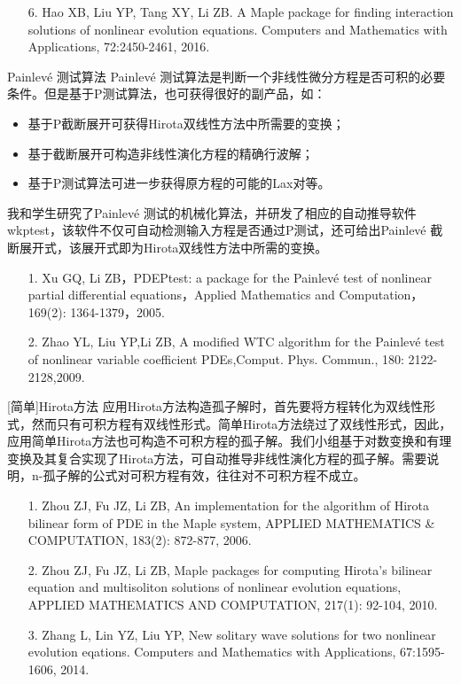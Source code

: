 \documentclass{beamer}
\begin{document}
\begin{frame}
  \begin{itemize}
    \item[6.] Hao XB, Liu YP, Tang XY, Li ZB. A Maple package for finding interaction solutions of nonlinear evolution equations. Computers and Mathematics with Applications, 72:2450-2461, 2016.
  \end{itemize}
 \end{frame}

\begin{frame}{Painlev\'e 测试算法}
Painlev\'e 测试算法是判断一个非线性微分方程是否可积的必要条件。但是基于P测试算法，也可获得很好的副产品，如：
\begin{itemize}
  \item 基于P截断展开可获得Hirota双线性方法中所需要的变换；
  \item 基于截断展开可构造非线性演化方程的精确行波解； 
  \item 基于P测试算法可进一步获得原方程的可能的Lax对等。
\end{itemize} 
我和学生研究了Painlev\'e 测试的机械化算法，并研发了相应的自动推导软件wkptest，该软件不仅可自动检测输入方程是否通过P测试，还可给出Painlev\'e 截断展开式，该展开式即为Hirota双线性方法中所需的变换。
\begin{itemize}
  \item[1.] Xu GQ, Li ZB，PDEPtest: a package for the Painlevé test of nonlinear partial differential equations，Applied Mathematics and Computation，169(2): 1364-1379，2005.
  \item[2.]Zhao YL, Liu YP,Li ZB,  A modified WTC algorithm for the Painlevé test of nonlinear variable coefficient PDEs,Comput. Phys. Commun., 180: 2122-2128,2009.   
\end{itemize}       
\end{frame}

\begin{frame}{[简单]Hirota方法}
应用Hirota方法构造孤子解时，首先要将方程转化为双线性形式，然而只有可积方程有双线性形式。简单Hirota方法绕过了双线性形式，因此，应用简单Hirota方法也可构造不可积方程的孤子解。我们小组基于对数变换和有理变换及其复合实现了Hirota方法，可自动推导非线性演化方程的孤子解。需要说明，n-孤子解的公式对可积方程有效，往往对不可积方程不成立。
 \begin{itemize}
  \item[1.] Zhou ZJ, Fu JZ, Li ZB, An implementation for the algorithm of Hirota bilinear form of PDE in the Maple system, APPLIED MATHEMATICS \& COMPUTATION, 183(2): 872-877, 2006.
  \item[2.] Zhou ZJ, Fu JZ, Li ZB, Maple packages for computing Hirota's bilinear equation and multisoliton solutions of nonlinear evolution equations, APPLIED MATHEMATICS AND COMPUTATION, 217(1): 92-104, 2010.
  \item[3.] Zhang L, Lin YZ, Liu YP, New solitary wave solutions for two nonlinear evolution eqations. Computers and Mathematics with Applications, 67:1595-1606, 2014.
 \end{itemize}
\end{frame}
\end{document}
